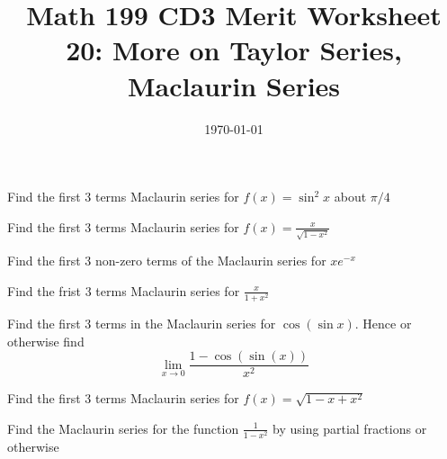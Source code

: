 
\usepackage{fullpage,amsmath,amssymb,amsthm}

\newcommand{\D}{\displaystyle}

\title{Math 199 CD3 Merit Worksheet 20: More on Taylor Series, Maclaurin Series}
\date{\today}




\maketitle

\be
	\item Find the first 3 terms Maclaurin series for $f(x)= \sin^2 x$ about $\pi/4$

	\vfill

	\item Find the first 3 terms Maclaurin series for $f(x)=\frac{x}{\sqrt{1-x^2}}$

	\vfill

	\item Find the first 3 non-zero terms of the Maclaurin series for $xe^{- x}$

	\vfill
	\item Find the frist 3 terms Maclaurin series for $\frac{x}{1+x^2}$
	\vfill
	\item Find the first 3 terms in the Maclaurin series for $\cos(\sin x)$. Hence or otherwise find 
	$$\lim_{x \to 0}\frac{1-\cos(\sin (x))}{x^2}$$
	\vfill

	\item Find the first 3 terms Maclaurin series for $f(x)=\sqrt{1-x+x^2}$
	\vfill

	\item Find the Maclaurin series for the function $\frac{1}{1-x^2}$ by using partial fractions or otherwise
	\vfill
\ee

